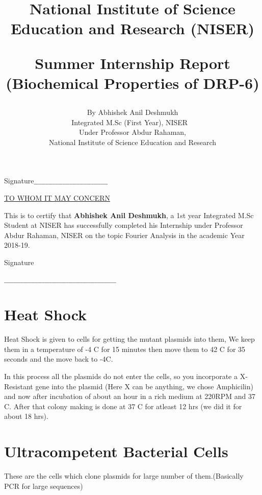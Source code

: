 \documentclass[11pt,twoside,a4paper]{article}
\title{National Institute of Science Education and Research (NISER)\\
\vspace{1.7cm}
\author{By Abhishek Anil Deshmukh \\
Integrated M.Sc (First Year), NISER
\vspace{1.5cm}\ \\
Under Professor Abdur Rahaman,\\ National Institute of Science Education and Research}
\vspace{1.5cm}
Summer Internship Report\\(Biochemical Properties of DRP-6)}
\begin{document}
\maketitle
\vfill
\hspace*{\fill} Signature$\_\_\_\_\_\_\_\_\_\_\_\_\_\_\_\_\_\_\_\_\_\_\_\_\_\_\_\_\_\_\_ $
\newpage
{}
\tableofcontents
\newpage
\begin{Huge}
\begin{center}
\underline{TO WHOM IT MAY CONCERN}
\end{center}
\end{Huge}
\vspace{2cm}
\begin{huge}
\begin{center}

This is to certify that \textbf{Abhishek Anil Deshmukh}, a 1st year Integrated M.Sc Student at NISER has successfully completed his Internship under Professor Abdur Rahaman, NISER on the topic Fourier Analysis in the academic Year 2018-19.
\end{center}
\vfill
\end{huge}
\begin{Large}
\hspace*{\fill} Signature
\end{Large}
$\_\_\_\_\_\_\_\_\_\_\_\_\_\_\_\_\_\_\_\_\_\_\_\_\_\_\_\_\_\_\_\_\_\_\_\_\_\_\_\_\_\_\_\_\_\_\_ $
\newpage
\section{Heat Shock}
Heat Shock  is given to cells for getting the mutant plasmids into them, We keep them in a temperature of -4 \textdegree C for 15 minutes then move them to 42 \textdegree C for 35 seconds and the move back to -4\textdegree C.

In this process all the plasmids do not enter the cells, so you incorporate a X-Resistant gene into the plasmid (Here X can be anything, we chose Amphicilin) and now after incubation of about an hour in a rich medium at 220RPM and 37 \textdegree C. After that colony making is done at 37 \textdegree C for atleast 12 hrs (we did it for about 18 hrs).

\section{Ultracompetent Bacterial Cells}
These are the cells which clone plasmids for large number of them.(Basically PCR for large sequences)
\end{document}
